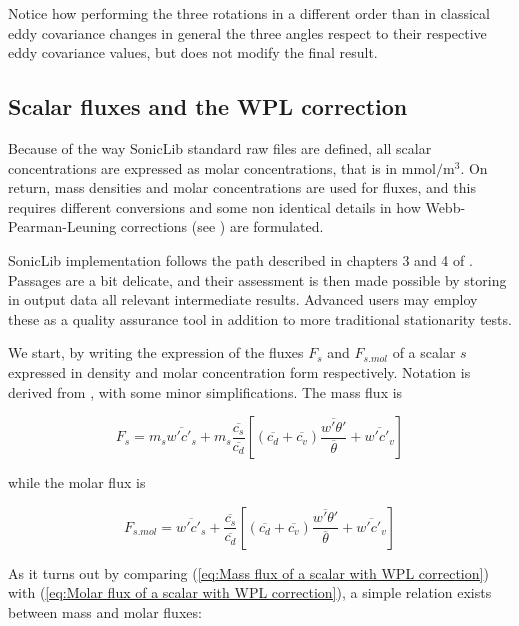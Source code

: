 \documentclass[a4paper,10pt]{book}
\begin{document}
Notice how performing the three rotations in a different order than in classical eddy covariance changes in general the three angles respect to their respective eddy covariance values, but does not modify the final result.

\subsection{Scalar fluxes and the WPL correction}

Because of the way SonicLib standard raw files are defined, all scalar concentrations are expressed as molar concentrations, that is in $\mbox{mmol}/\mbox{m}^{3}$. On return, mass densities and molar concentrations are used for fluxes, and this requires different conversions and some non identical details in how Webb-Pearman-Leuning corrections (see \cite{Webb1980}) are formulated.

SonicLib implementation follows the path described in chapters 3 and 4 of \cite{Aubinet2012}. Passages are a bit delicate, and their assessment is then made possible by storing in output data all relevant intermediate results. Advanced users may employ these as a quality assurance tool in addition to more traditional stationarity tests.

We start, by writing the expression of the fluxes $F_{s}$ and $F_{s.mol}$ of a scalar $s$ expressed in density and molar concentration form respectively. Notation is derived from \cite{Aubinet2012}, with some minor simplifications. The mass flux is

\begin{equation}\label{eq:Mass flux of a scalar with WPL correction}
 F_{s} = m_{s} \overline{w'c'_{s}} + m_{s} \frac{\overline{c_{s}}}{\overline{c_{d}}} \left[
  \left( \overline{c_{d}} + \overline{c_{v}} \right) \frac{\overline{w'\theta'}}{\overline{\theta}} +
  \overline{w'c'_{v}}
 \right]
\end{equation} 

\noindent while the molar flux is

\begin{equation}\label{eq:Molar flux of a scalar with WPL correction}
 F_{s.mol} = \overline{w'c'_{s}} + \frac{\overline{c_{s}}}{\overline{c_{d}}} \left[
  \left( \overline{c_{d}} + \overline{c_{v}} \right) \frac{\overline{w'\theta'}}{\overline{\theta}} +
  \overline{w'c'_{v}}
 \right]
\end{equation} 

As it turns out by comparing (\ref{eq:Mass flux of a scalar with WPL correction}) with (\ref{eq:Molar flux of a scalar with WPL correction}), a simple relation exists between mass and molar fluxes:
\end{document}

